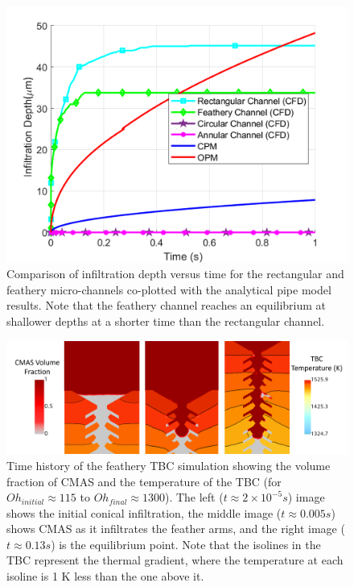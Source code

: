 \documentclass[%
 aip,
 amsmath,amssymb,
 reprint,%
]{revtex4-1}
\begin{document}

\begin{figure}
    \centering
    \includegraphics[width=\linewidth]{Figures/Rect_v_feather.png}
    \caption{Comparison of infiltration depth versus time for the rectangular and feathery micro-channels co-plotted with the analytical pipe model results. Note that the feathery channel reaches an equilibrium at shallower depths at a shorter time than the rectangular channel.}
    \label{fig:rect_v_feather}
\end{figure}

\begin{figure}
    \centering
    \includegraphics[width=\linewidth]{Figures/featheryTimeHistory.png}
    \caption{Time history of the feathery TBC simulation showing the volume fraction of CMAS and the temperature of the TBC (for $Oh_{initial} \approx 115$ to $Oh_{final} \approx 1300$). The left ($t \approx 2\times 10^{-5}s$) image shows the initial conical infiltration, the middle image ($t\approx 0.005 s$) shows CMAS as it infiltrates the feather arms, and the right image ($t \approx 0.13 s$) is the equilibrium point. Note that the isolines in the TBC represent the thermal gradient, where the temperature at each isoline is 1 K less than the one above it.}
    \label{fig:feathery_timehistory}
\end{figure}
\end{document}
